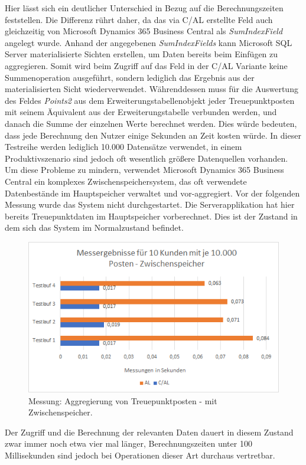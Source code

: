 Hier lässt sich ein deutlicher Unterschied in Bezug auf die Berechnungszeiten feststellen. Die Differenz rührt daher, da das via C/AL erstellte Feld auch gleichzeitig von Microsoft Dynamics 365 Business Central als \textit{SumIndexField} angelegt wurde. Anhand der angegebenen \textit{SumIndexFields} kann Microsoft SQL Server materialisierte Sichten erstellen, um Daten bereits beim Einfügen zu aggregieren. Somit wird beim Zugriff auf das Feld in der C/AL Variante keine Summenoperation ausgeführt, sondern lediglich das Ergebnis aus der materialisierten Sicht wiederverwendet. Währenddessen muss für die Auswertung des Feldes \textit{Points2} aus dem Erweiterungstabellenobjekt jeder Treuepunktposten mit seinem Äquivalent aus der Erweiterungstabelle verbunden werden, und danach die Summe der einzelnen Werte berechnet werden. Dies würde bedeuten, dass jede Berechnung den Nutzer einige Sekunden an Zeit kosten würde. In dieser Testreihe werden lediglich 10.000 Datensätze verwendet, in einem Produktivszenario sind jedoch oft wesentlich größere Datenquellen vorhanden. Um diese Probleme zu mindern, verwendet Microsoft Dynamics 365 Business Central ein komplexes Zwischenspeichersystem, das oft verwendete Datenbestände im Hauptspeicher verwaltet und vor-aggregiert. 
Vor der folgenden Messung wurde das System nicht durchgestartet. Die Serverapplikation hat hier bereits Treuepunktdaten im Hauptspeicher vorberechnet. Dies ist der Zustand in dem sich das System im Normalzustand befindet.
\begin{figure}[H]
	\centering
	\includegraphics[width=140mm]{images/Test2Cache}
	\caption{Messung: Aggregierung von Treuepunktposten - mit Zwischenspeicher.}
	\label{fig:Test2Schema}
\end{figure}

Der Zugriff und die Berechnung der relevanten Daten dauert in diesem Zustand zwar immer noch etwa vier mal länger, Berechnungszeiten unter 100 Millisekunden sind jedoch bei Operationen dieser Art durchaus vertretbar.

